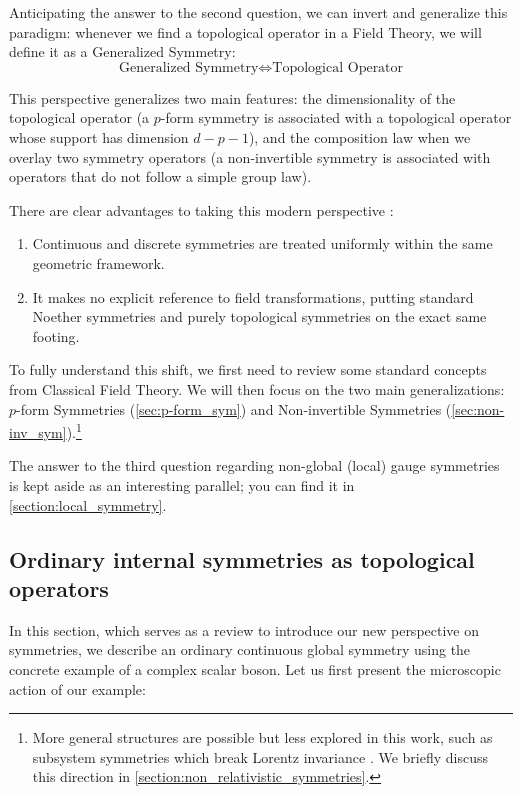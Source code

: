 \documentclass[aps,preprint,nofootinbib,preprintnumbers,eqsecnum,superscriptaddress]{revtex4}
\numberwithin{equation}{section}
\begin{document}
Anticipating the answer to the second question, we can invert and generalize this paradigm: whenever we find a topological operator in a Field Theory, we will define it as a Generalized Symmetry:
\begin{equation}
    \text{Generalized Symmetry} \iff \text{Topological Operator}
\end{equation}

This perspective generalizes two main features: the dimensionality of the topological operator (a $p$-form symmetry is associated with a topological operator whose support has dimension $d-p-1$), and the composition law when we overlay two symmetry operators (a non-invertible symmetry is associated with operators that do not follow a simple group law).

There are clear advantages to taking this modern perspective \cite{McGreevy_2023}:
\begin{enumerate}[\itshape i)]
    \item Continuous and discrete symmetries are treated uniformly within the same geometric framework.
    \item It makes no explicit reference to field transformations, putting standard Noether symmetries and purely topological symmetries on the exact same footing.
\end{enumerate}

To fully understand this shift, we first need to review some standard concepts from Classical Field Theory. We will then focus on the two main generalizations: $p$-form Symmetries (\ref{sec:p-form_sym}) and Non-invertible Symmetries (\ref{sec:non-inv_sym}).\footnote{More general structures are possible but less explored in this work, such as subsystem symmetries which break Lorentz invariance \cite{McGreevy_2023}. We briefly discuss this direction in \ref{section:non_relativistic_symmetries}.}

The answer to the third question regarding non-global (local) gauge symmetries is kept aside as an interesting parallel; you can find it in \ref{section:local_symmetry}.

\subsection{Ordinary internal symmetries as topological operators}

In this section, which serves as a review to introduce our new perspective on symmetries, we describe an ordinary continuous global symmetry using the concrete example of a complex scalar boson. Let us first present the microscopic action of our example:
\end{document}
